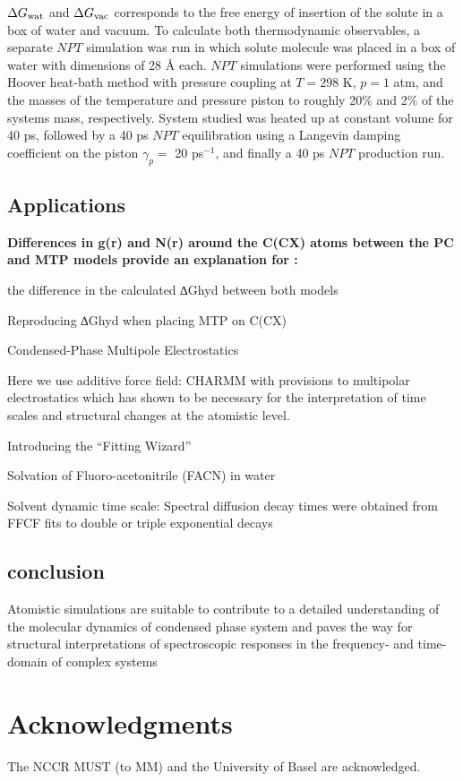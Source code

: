 \documentclass[journal=jacsat,manuscript=article]{achemso}
\begin{document}
   $\Delta G_{\rm wat}$ and $\Delta G_{\rm vac}$ corresponds to the free
   energy of insertion of the solute in a box of water and vacuum. To
   calculate both thermodynamic observables, a separate $NPT$ simulation
   was run in which solute molecule was placed in a box of water with
   dimensions of 28 \AA\/ each.  $NPT$ simulations were performed using
   the Hoover heat-bath method with pressure coupling\cite{feller1995} at
   $T = 298$ K, $p = 1$ atm, and the masses of the temperature and
   pressure piston to roughly 20\% and 2\% of the systems mass,
   respectively. System studied was heated up at constant volume for 40
   ps, followed by a 40 ps $NPT$ equilibration using a Langevin damping
   coefficient on the piston $\gamma_p=$ 20 ps$^{-1}$, and finally a 40
   ps $NPT$ production run.\\
 
   \subsection{Applications}
  { \bf Differences in g(r) and N(r) around the C(CX) atoms between the PC and MTP models provide an explanation for :

   the difference in the calculated ∆Ghyd between both models

   Reproducing ∆Ghyd when placing MTP on C(CX)

   
   
   Condensed-Phase Multipole Electrostatics

   
   Here we use additive force field: CHARMM
   with provisions to multipolar electrostatics which has shown to be necessary for the interpretation of time scales and structural changes at the atomistic level.
   
   Introducing the “Fitting Wizard”

   
   Solvation of Fluoro-acetonitrile (FACN) in water

   
   Solvent dynamic time scale: Spectral diffusion decay times were obtained from FFCF fits to double or triple exponential decays
}

\subsection{conclusion}
Atomistic simulations are suitable to contribute to a detailed understanding of the molecular dynamics of condensed phase system and paves the way for structural interpretations of spectroscopic responses in the frequency- and time-domain of complex systems

\section*{Acknowledgments}
The NCCR MUST (to MM) and the University of Basel are acknowledged.



\end{document}
